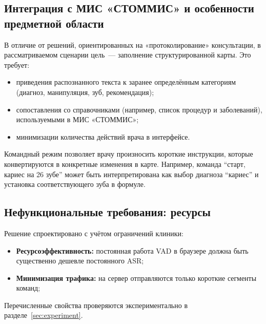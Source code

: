 \subsection{Интеграция с МИС «СТОММИС» и особенности предметной области}
\label{subsec:stommis}

В отличие от решений, ориентированных на «протоколирование» консультации, в рассматриваемом сценарии цель~--- заполнение структурированной карты.
Это требует:
\begin{itemize}
    \item приведения распознанного текста к заранее определённым категориям (диагноз, манипуляция, зуб, рекомендация);
    \item сопоставления со справочниками (например, список процедур и заболеваний), используемыми в МИС «СТОММИС»;
    \item минимизации количества действий врача в интерфейсе.
\end{itemize}

Командный режим позволяет врачу произносить короткие инструкции, которые конвертируются в конкретные изменения в карте.
Например, команда \enquote{старт, кариес на 26 зубе} может быть интерпретирована как выбор диагноза \enquote{кариес} и установка соответствующего зуба в формуле.

\subsection{Нефункциональные требования: ресурсы}
\label{subsec:nfr}

Решение спроектировано с учётом ограничений клиники:
\begin{itemize}
    \item \textbf{Ресурсоэффективность:} постоянная работа VAD в браузере должна быть существенно дешевле постоянного ASR;
    \item \textbf{Минимизация трафика:} на сервер отправляются только короткие сегменты команд;
\end{itemize}

Перечисленные свойства проверяются экспериментально в разделе~\ref{sec:experiment}.
